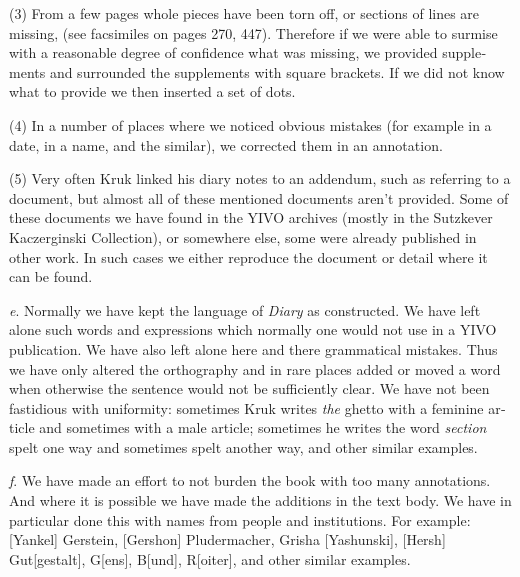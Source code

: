 \documentclass{article}
\begin{document}
\begin{pairs}
\begin{Leftside}
\begin{english}
(3) From a few pages whole pieces have been torn off, or sections of lines are missing, (see
facsimiles on pages 270, 447). Therefore if we were able to surmise with a reasonable
degree of confidence what was missing, we provided supplements and surrounded the supplements
with square brackets. If we did not know what to provide we then inserted a set of dots.

(4) In a number of places where we noticed obvious mistakes (for example in a date, in a name, and the similar),
we corrected them in an annotation.

(5) Very often Kruk linked his diary notes to an addendum, such as referring to a document, but
almost all of these mentioned documents aren't provided. Some of these documents we have
found in the YIVO archives (mostly in the Sutzkever Kaczerginski Collection),
or somewhere else, some were already published in other work. In such cases we either reproduce the document or detail where it can be found.

\emph{e}. Normally we have kept the language of \emph{Diary} as constructed. We have left alone such words
and expressions which normally one would not use in a YIVO publication. We have also left alone here
and there grammatical mistakes. Thus we have only altered the orthography and in rare places added or moved a word
when otherwise the sentence would not be sufficiently clear. We have not been fastidious with uniformity: sometimes Kruk
writes \emph{the} ghetto  with a feminine article and sometimes with a male article; sometimes he writes the word \emph{section}
spelt one way and sometimes spelt another way, and other similar examples. 

\emph{f}. We have made an effort to not burden the book with too many annotations.
And where it is possible we have made the additions in the text body. We have
in particular done this with names from people and institutions. For example:
[Yankel] Gerstein, [Gershon] Pludermacher, Grisha [Yashunski], [Hersh] Gut[gestalt], G[ens],
B[und], R[oiter], and other similar examples.

\endnumbering
\end{english}
\end{Leftside}

\end{pairs}
\Columns
\end{document}
